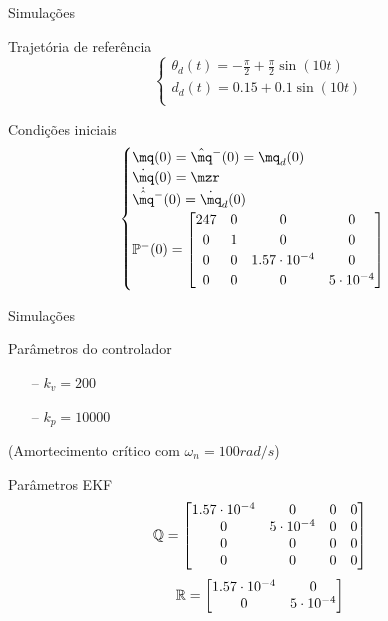 \documentclass[25pt,landscape]{beamer}
\begin{document}
\begin{frame}{Simula\c{c}\~oes}
	\begin{block}{Trajet\'oria de refer\^encia}
		$$
		\begin{cases}
			\theta_d(t) = -\frac{\pi}{2} +  \frac{\pi}{2} \sin(10 t) \\
			d_d(t) = 0.15 +  0.1 \sin(10 t) \\
		\end{cases}
		$$
	\end{block}
	\begin{block}{Condi\c{c}\~oes iniciais}
		$$
		\begin{cases}
			\mq(0) = \hat{\mq}^-(0) = \mq_d(0) \\
			\dot{\mq}(0) = \mzr \\
			\dot{\hat{\mq}}^-(0) = \dot{\mq}_d(0) \\
			\mP^-(0) =
			\begin{bmatrix}
				247 & 0 & 0 & 0 \\
				0     & 1 & 0 & 0 \\
				0     & 0 & 1.57 \cdot 10^{-4} & 0 \\
				0     & 0 & 0               & 5 \cdot 10^{-4}
			\end{bmatrix} 
		\end{cases}
		$$
	\end{block}
\end{frame}

\begin{frame}{Simula\c{c}\~oes}
	\begin{block}{Par\^ametros do controlador}
		\begin{itemize}
			\item[--] $ k_v = 200 $  \\[8pt]
			\item[--] $ k_p = 10000 $ \\[8pt]
		\end{itemize}
		(Amortecimento cr\'itico com $\omega_n = 100 rad/s $)
	\end{block}
	\begin{block}{Par\^ametros EKF}
			$$ \mathbb{Q} = 
				\begin{bmatrix}
					1.57 \cdot 10^{-4} & 0 & 0 & 0 \\
					0     & 5 \cdot 10^{-4} & 0 & 0 \\
					0     & 0 & 0 & 0 \\
					0     & 0 & 0   & 0
				\end{bmatrix} $$
			$$ \mathbb{R} = 
				\begin{bmatrix}
					1.57 \cdot 10^{-4} & 0\\
					0     & 5 \cdot 10^{-4} \\
				\end{bmatrix} $$
	\end{block}
\end{frame}
\end{document}
